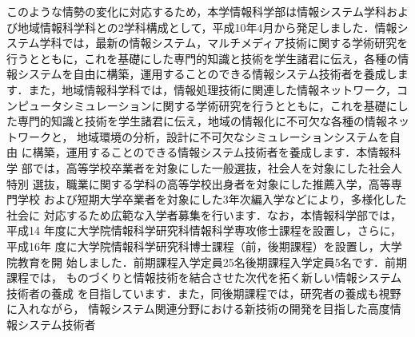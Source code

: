 \documentclass[a4j,9pt,twocolumn,dvipdfmx]{jsarticle}
\begin{document}
このような情勢の変化に対応するため，本学情報科学部は情報システム学科およ
び地域情報科学科との2学科構成として，平成10年4月から発足しました．情報シ
ステム学科では，最新の情報システム，マルチメディア技術に関する学術研究を
行うとともに，これを基礎にした専門的知識と技術を学生諸君に伝え，各種の情
報システムを自由に構築，運用することのできる情報システム技術者を養成しま
す．また，地域情報科学科では，情報処理技術に関連した情報ネットワーク，コ
ンピュータシミュレーションに関する学術研究を行うとともに，これを基礎にし
た専門的知識と技術を学生諸君に伝え，地域の情報化に不可欠な各種の情報ネッ
トワークと，
地域環境の分析，設計に不可欠なシミュレーションシステムを自由
に構築，運用することのできる情報システム技術者を養成します．本情報科学
部では，高等学校卒業者を対象にした一般選抜，社会人を対象にした社会人特別
選抜，職業に関する学科の高等学校出身者を対象にした推薦入学，高等専門学校
および短期大学卒業者を対象にした3年次編入学などにより，多様化した社会に
対応するため広範な入学者募集を行います．なお，本情報科学部では，平成14
年度に大学院情報科学研究科情報科学専攻修士課程を設置し，さらに，平成16年
度に大学院情報科学研究科博士課程（前，後期課程）を設置し，大学院教育を開
始しました．前期課程入学定員25名後期課程入学定員5名です．前期課程では，
ものづくりと情報技術を結合させた次代を拓く新しい情報システム技術者の養成
を目指しています．また，同後期課程では，研究者の養成も視野に入れながら，
情報システム関連分野における新技術の開発を目指した高度情報システム技術者
\end{document}

